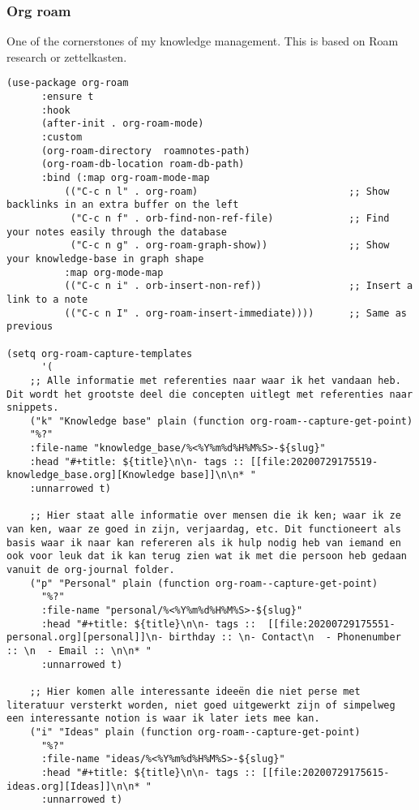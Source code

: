 \documentclass[11pt]{article}
\begin{document}
\subsubsection{Org roam}
\label{sec:org8bdf69b}
One of the cornerstones of my knowledge management. This is based on Roam research or zettelkasten. 
\begin{verbatim}
(use-package org-roam
      :ensure t
      :hook
      (after-init . org-roam-mode)
      :custom
      (org-roam-directory  roamnotes-path)
      (org-roam-db-location roam-db-path)
      :bind (:map org-roam-mode-map
	      (("C-c n l" . org-roam)                          ;; Show backlinks in an extra buffer on the left
	       ("C-c n f" . orb-find-non-ref-file)             ;; Find your notes easily through the database
	       ("C-c n g" . org-roam-graph-show))              ;; Show your knowledge-base in graph shape
	      :map org-mode-map
	      (("C-c n i" . orb-insert-non-ref))               ;; Insert a link to a note
	      (("C-c n I" . org-roam-insert-immediate))))      ;; Same as previous

(setq org-roam-capture-templates
      '(
	;; Alle informatie met referenties naar waar ik het vandaan heb. Dit wordt het grootste deel die concepten uitlegt met referenties naar snippets.
	("k" "Knowledge base" plain (function org-roam--capture-get-point)
	"%?"
	:file-name "knowledge_base/%<%Y%m%d%H%M%S>-${slug}"
	:head "#+title: ${title}\n\n- tags :: [[file:20200729175519-knowledge_base.org][Knowledge base]]\n\n* "
	:unnarrowed t)

	;; Hier staat alle informatie over mensen die ik ken; waar ik ze van ken, waar ze goed in zijn, verjaardag, etc. Dit functioneert als basis waar ik naar kan refereren als ik hulp nodig heb van iemand en ook voor leuk dat ik kan terug zien wat ik met die persoon heb gedaan vanuit de org-journal folder.
	("p" "Personal" plain (function org-roam--capture-get-point)
	  "%?"
	  :file-name "personal/%<%Y%m%d%H%M%S>-${slug}"
	  :head "#+title: ${title}\n\n- tags ::  [[file:20200729175551-personal.org][personal]]\n- birthday :: \n- Contact\n  - Phonenumber :: \n  - Email :: \n\n* "
	  :unnarrowed t)

	;; Hier komen alle interessante ideeën die niet perse met literatuur versterkt worden, niet goed uitgewerkt zijn of simpelweg een interessante notion is waar ik later iets mee kan.
	("i" "Ideas" plain (function org-roam--capture-get-point)
	  "%?"
	  :file-name "ideas/%<%Y%m%d%H%M%S>-${slug}"
	  :head "#+title: ${title}\n\n- tags :: [[file:20200729175615-ideas.org][Ideas]]\n\n* "
	  :unnarrowed t)


\end{verbatim}
\end{document}
